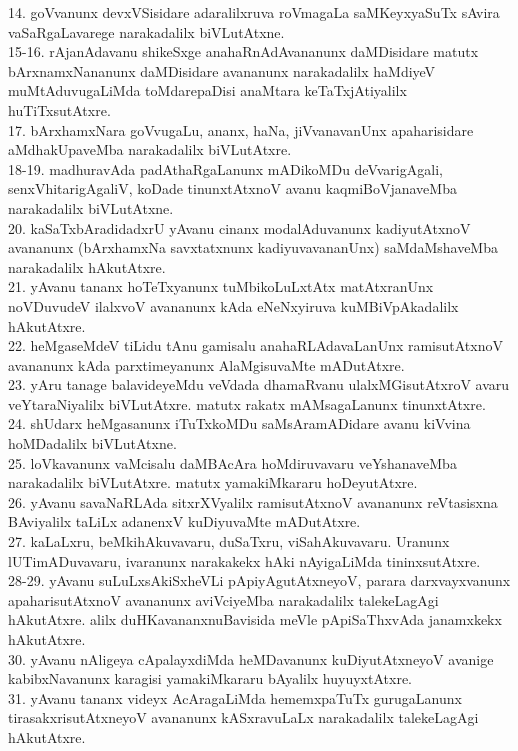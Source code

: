 \documentclass{article}
\begin{document}
14. goVvanunx devxVSisidare adaralilxruva roVmagaLa saMKeyxyaSuTx sAvira vaSaRgaLavarege narakadalilx biVLutAtxne.\\
15-16. rAjanAdavanu shikeSxge anahaRnAdAvananunx daMDisidare matutx bArxnamxNananunx daMDisidare avananunx narakadalilx haMdiyeV muMtAduvugaLiMda toMdarepaDisi anaMtara keTaTxjAtiyalilx huTiTxsutAtxre.\\
17. bArxhamxNara goVvugaLu, ananx, haNa, jiVvanavanUnx apaharisidare aMdhakUpaveMba narakadalilx biVLutAtxre.\\
18-19. madhuravAda padAthaRgaLanunx mADikoMDu deVvarigAgali, senxVhitarigAgaliV, koDade tinunxtAtxnoV avanu kaqmiBoVjanaveMba narakadalilx biVLutAtxne.\\
20. kaSaTxbAradidadxrU yAvanu cinanx modalAduvanunx kadiyutAtxnoV avananunx (bArxhamxNa savxtatxnunx kadiyuvavananUnx) saMdaMshaveMba narakadalilx hAkutAtxre.\\
21. yAvanu tananx hoTeTxyanunx tuMbikoLuLxtAtx matAtxranUnx noVDuvudeV ilalxvoV avananunx kAda eNeNxyiruva kuMBiVpAkadalilx hAkutAtxre.\\
22. heMgaseMdeV tiLidu tAnu gamisalu anahaRLAdavaLanUnx ramisutAtxnoV avananunx kAda parxtimeyanunx AlaMgisuvaMte mADutAtxre.\\
23. yAru tanage balavideyeMdu veVdada dhamaRvanu ulalxMGisutAtxroV avaru veYtaraNiyalilx biVLutAtxre. matutx rakatx mAMsagaLanunx tinunxtAtxre.\\
24. shUdarx heMgasanunx iTuTxkoMDu saMsAramADidare avanu kiVvina hoMDadalilx biVLutAtxne.\\
25. loVkavanunx vaMcisalu daMBAcAra hoMdiruvavaru veYshanaveMba narakadalilx biVLutAtxre. matutx yamakiMkararu hoDeyutAtxre.\\
26. yAvanu savaNaRLAda sitxrXVyalilx ramisutAtxnoV avananunx reVtasisxna BAviyalilx taLiLx adanenxV kuDiyuvaMte mADutAtxre.\\
27. kaLaLxru, beMkihAkuvavaru, duSaTxru, viSahAkuvavaru. Uranunx lUTimADuvavaru, ivaranunx narakakekx hAki nAyigaLiMda tininxsutAtxre.\\
28-29. yAvanu suLuLxsAkiSxheVLi pApiyAgutAtxneyoV, parara darxvayxvanunx apaharisutAtxnoV avananunx aviVciyeMba narakadalilx talekeLagAgi hAkutAtxre. alilx duHKavananxnuBavisida meVle pApiSaThxvAda janamxkekx hAkutAtxre.\\
30. yAvanu nAligeya cApalayxdiMda heMDavanunx kuDiyutAtxneyoV avanige kabibxNavanunx karagisi yamakiMkararu bAyalilx huyuyxtAtxre.\\
31. yAvanu tananx videyx AcAragaLiMda hememxpaTuTx gurugaLanunx tirasakxrisutAtxneyoV avananunx kASxravuLaLx narakadalilx talekeLagAgi hAkutAtxre.\\
\end{document}
